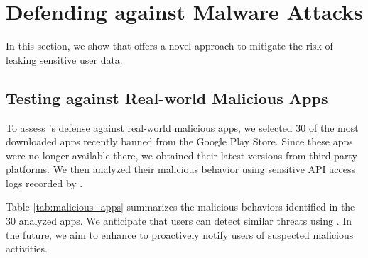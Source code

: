 \section{Defending against Malware Attacks}
\label{sec:mitigating_sca}

In this section, we show that \framework{} offers a novel approach to mitigate the risk of leaking sensitive user data.

\subsection{Testing \framework{} against Real-world Malicious Apps}
\label{sec:malicious_apps}



To assess \framework{}'s defense against real-world malicious apps, we selected 30 of the most downloaded apps recently banned from the Google Play Store. Since these apps were no longer available there, we obtained their latest versions from third-party platforms. We then analyzed their malicious behavior using sensitive API access logs recorded by \framework{}.


Table \ref{tab:malicious_apps} summarizes the malicious behaviors identified in the 30 analyzed apps. 
We anticipate that users can detect similar threats using \framework{}. In the future, we aim to enhance \framework{} to proactively notify users of suspected malicious activities.






